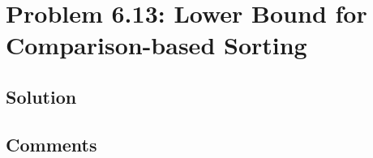 
\section{Problem 6.13: Lower Bound for Comparison-based Sorting}

\subsection{Solution}

\subsection{Comments}
